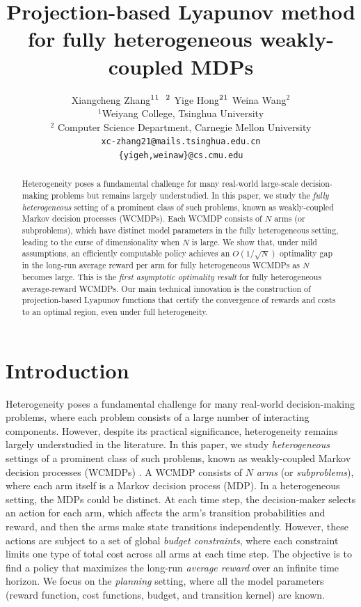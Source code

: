 \documentclass{article}
\title{Projection-based Lyapunov method for fully heterogeneous weakly-coupled MDPs}
\author{%
Xiangcheng Zhang$^{1}\footnotemark[1] ~~\footnotemark[2]$ \quad Yige Hong$^{2}\footnotemark[1]$ \quad  Weina Wang$^{2}$\medskip\\
$^1$Weiyang College, Tsinghua University  \\ $^2$ Computer Science Department, Carnegie Mellon University \\
\texttt{xc-zhang21@mails.tsinghua.edu.cn}\\
\texttt{\{yigeh,weinaw\}@cs.cmu.edu}
}
\theoremstyle{plain}
\theoremstyle{remark}
\renewcommand{\thefootnote}{\fnsymbol{footnote}}
\begin{document}
\renewcommand{\thefootnote}{\arabic{footnote}}
\setcounter{footnote}{0}


\renewcommand{\thefootnote}{\arabic{footnote}}

\date{}
\maketitle


\begin{abstract}%
Heterogeneity poses a fundamental challenge for many real-world large-scale decision-making problems but remains largely understudied.
In this paper, we study the \emph{fully heterogeneous} setting of a prominent class of such problems, known as weakly-coupled Markov decision processes (WCMDPs).
Each WCMDP consists of $N$ arms (or subproblems), which have distinct model parameters in the fully heterogeneous setting, leading to the curse of dimensionality when $N$ is large.
We show that, under mild assumptions, an efficiently computable policy achieves an $O(1/\sqrt{N})$ optimality gap in the long-run average reward per arm for fully heterogeneous WCMDPs as $N$ becomes large.
This is the \emph{first asymptotic optimality result} for fully heterogeneous average-reward WCMDPs.
Our main technical innovation is the construction of projection-based Lyapunov functions that certify the convergence of rewards and costs to an optimal region, even under full heterogeneity.
\end{abstract}

\tableofcontents


\section{Introduction}
\label{sec:introduction}

Heterogeneity poses a fundamental challenge for many real-world decision-making problems, where each problem consists of a large number of interacting components.
However, despite its practical significance, heterogeneity remains largely understudied in the literature.
In this paper, we study \emph{heterogeneous} settings of a prominent class of such problems, known as weakly-coupled Markov decision processes (WCMDPs) \citep{Haw_03}.
A WCMDP consists of $N$ \emph{arms} (or \emph{subproblems}), where each arm itself is a Markov decision process (MDP).
In a heterogeneous setting, the MDPs could be distinct. 
At each time step, the decision-maker selects an action for each arm, which affects the arm's transition probabilities and reward, and then the arms make state transitions independently.
However, these actions are subject to a set of global \emph{budget constraints}, where each constraint limits one type of total cost across all arms at each time step.
The objective is to find a policy that maximizes the long-run \emph{average reward} over an infinite time horizon.
We focus on the \emph{planning} setting, where all the model parameters (reward function, cost functions, budget, and transition kernel) are known. \nocite{ZhaHonWan_25_het_wcmdp_nips_ver_on_arxiv}
\end{document}
